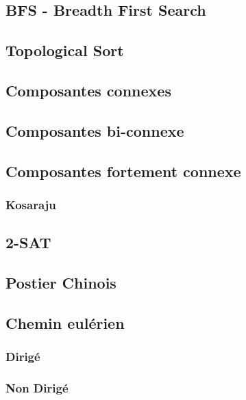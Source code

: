 \documentclass[8pt]{article}
\begin{document}
        \subsection{BFS - Breadth First Search}
        {\scriptsize}
        \subsection{Topological Sort}
        {\scriptsize}
        \subsection{Composantes connexes}
        \subsection{Composantes bi-connexe}
        {\scriptsize}
        \subsection{Composantes fortement connexe}
            \subsubsection{Kosaraju}
            {\scriptsize}
        \subsection{2-SAT}
        {\scriptsize}
        \subsection{Postier Chinois}
        \subsection{Chemin eulérien}
            \subsubsection{Dirigé}
            {\scriptsize}
            \subsubsection{Non Dirigé}
            {\scriptsize}
\end{document}
